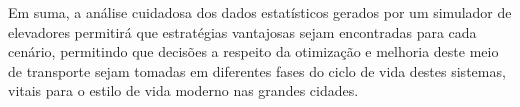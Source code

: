 Em suma, a análise cuidadosa dos dados estatísticos gerados por um simulador de
elevadores permitirá que estratégias vantajosas sejam encontradas para cada
cenário, permitindo que decisões a respeito da otimização e melhoria deste meio
de transporte sejam tomadas em diferentes fases do ciclo de vida destes
sistemas, vitais para o estilo de vida moderno nas grandes cidades.
